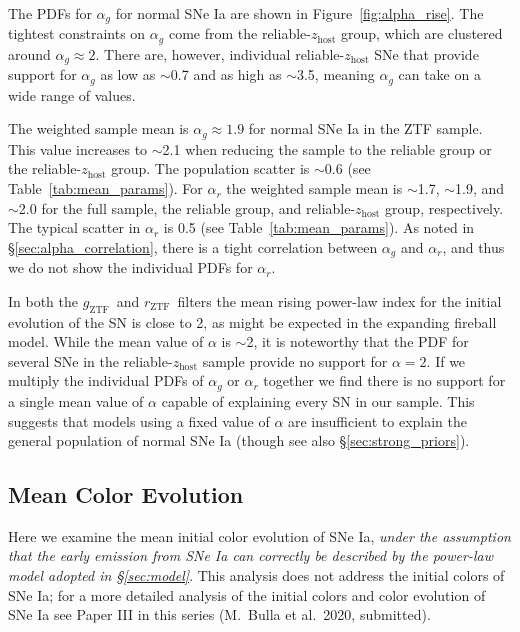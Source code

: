 \documentclass[twocolumn]{./aastex63}
\newcommand{\rztf}{$r_\mathrm{ZTF}$}
\newcommand{\gztf}{$g_\mathrm{ZTF}$}
\begin{document}
The PDFs for $\alpha_g$ for normal SNe Ia are shown in
Figure~\ref{fig:alpha_rise}. The tightest constraints on $\alpha_g$ come from
the reliable-$z_\mathrm{host}$ group, which are clustered around $\alpha_g
\approx 2$. There are, however, individual reliable-$z_\mathrm{host}$ SNe that
provide support for $\alpha_g$ as low as $\sim$0.7 and as high as $\sim$3.5, meaning $\alpha_g$ can take on a wide range of values.

The weighted sample mean is $\alpha_g \approx 1.9$ for normal SNe Ia in the
ZTF sample. This value increases to $\sim$2.1 when reducing the sample to the
reliable group or the reliable-$z_\mathrm{host}$ group. The population scatter
is $\sim$0.6 (see Table~\ref{tab:mean_params}). For $\alpha_r$ the weighted
sample mean is $\sim$1.7, $\sim$1.9, and $\sim$2.0 for the full sample, the
reliable group, and reliable-$z_\mathrm{host}$ group, respectively. The
typical scatter in $\alpha_r$ is 0.5 (see Table~\ref{tab:mean_params}). As
noted in \S\ref{sec:alpha_correlation}, there is a tight correlation
between $\alpha_g$ and $\alpha_r$, and thus we do not show the individual PDFs
for $\alpha_r$.

In both the \gztf\ and \rztf\ filters the mean rising power-law index for the
initial evolution of the SN is close to 2, as might be expected in
the expanding fireball model. While the mean value of $\alpha$
is $\sim$2, it is noteworthy that the PDF for several SNe in the
reliable-$z_\mathrm{host}$ sample provide no support for $\alpha = 2$. If we
multiply the individual PDFs of $\alpha_g$ or $\alpha_r$ together we find
there is no support for a single mean value of $\alpha$ capable of explaining
every SN in our sample. This suggests that models using a fixed value of
$\alpha$ are insufficient to explain the general population of normal SNe Ia
(though see also \S\ref{sec:strong_priors}).



\subsection{Mean Color Evolution}\label{sec:colors}

Here we examine the mean initial color evolution of SNe Ia, \textit{under the
assumption that the early emission from SNe Ia can correctly be described by
the power-law model adopted in \S\ref{sec:model}}. This analysis does not
address the initial colors of SNe Ia; for a more detailed analysis of the
initial colors and color evolution of SNe Ia see Paper III in this series
(M.~Bulla et al.~2020, submitted).
\end{document}
